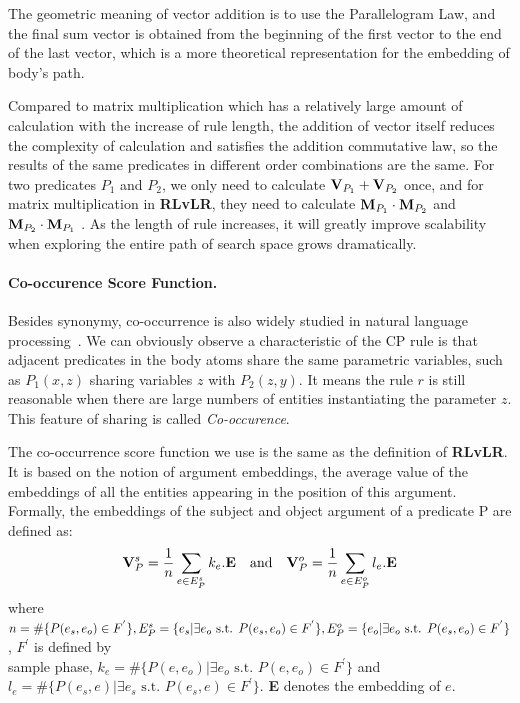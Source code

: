 \documentclass{article}
\begin{document}
	The geometric meaning of vector addition is to use the Parallelogram Law, and the final sum vector is obtained from the beginning of the first vector to the end of the last vector, which is a more theoretical representation for the embedding of body's path.
	
	Compared to matrix multiplication which has a relatively large amount of calculation with the increase of rule length, the addition of vector itself reduces the complexity of calculation and satisfies the addition commutative law, so the results of the same predicates in different order combinations are the same. For two predicates $P_1$ and $P_2$, we only need to calculate ${\bf V}_{P_1}+{\bf V}_{P_2}$ once, and for matrix multiplication in {\bf RLvLR}, they need to calculate ${\bf M}_{P_1}\cdot {\bf M}_{P_2}$ and ${\bf M}_{P_2}\cdot {\bf M}_{P_1}$ . As the length of rule increases, it will greatly improve scalability when exploring the entire path of search space grows dramatically.
	
	\paragraph{Co-occurence Score Function.}
	Besides synonymy, co-occurrence is also widely studied in natural language processing~\cite{Jones:Co-occurence}. We can obviously observe a characteristic of the CP rule is that adjacent predicates in the body atoms share the same parametric variables, such as $P_1(x,z)$ sharing variables $z$ with $P_2(z,y)$. It means the rule $r$ is still reasonable when there are large numbers of entities instantiating the parameter $z$. This feature of sharing is called \textit{Co-occurence}. 
	
	The co-occurrence score function we use is the same as the definition of {\bf RLvLR}. It is based on the notion of argument embeddings, the average value of the embeddings of all the entities appearing in the position of this argument. Formally, the embeddings of the subject and object argument of a predicate P are defined as:
	$$
	{\bf V}_P^s = \frac{1}{n} \sum _{e \in E_P^s}k_e.{\bf E} \text{\quad and\quad}	
	{\bf V}_P^o = \frac{1}{n} \sum _{e \in E_P^o}l_e.{\bf E} 
	$$ 
	where $n = \#\{P(e_s, e_o) \in F^{'}\}, E_P^s = \{e_s|\exists e_o \text{ s.t. } P(e_s, e_o)\\
	\in F^{'}\} , E_P^o = \{e_o|\exists e_o \text{ s.t. } P(e_s, e_o) \in F^{'}\}$, $F^{'}$ is defined by\\
	sample phase, $k_e = \#\{P(e, e_o)|\exists e_o \text{ s.t. } P(e, e_o) \in F^{'} \}$ and $l_e = \#\{P(e_s,e)|\exists e_s \text{ s.t. } P(e_s, e) \in F^{'} \}$. {\bf E} denotes the embedding of $e$.
	
\end{document}

